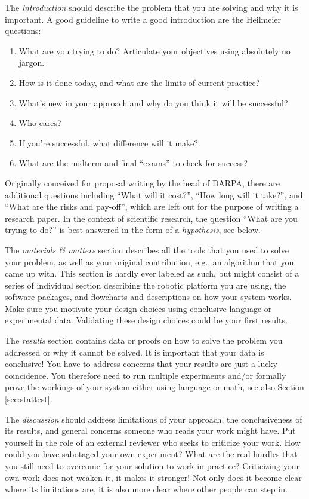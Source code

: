 \documentclass[paper=6.14in:9.21in,pagesize=pdftex,11pt,twoside,openright]{scrbook}
\begin{document}
The \emph{introduction} should describe the problem that you are solving and why it is important. A good guideline to write a good introduction are the Heilmeier questions:

\begin{enumerate}
\item What are you trying to do? Articulate your objectives using absolutely no jargon.
\item How is it done today, and what are the limits of current practice?
\item What's new in your approach and why do you think it will be successful?
\item Who cares?
\item If you're successful, what difference will it make?
\item What are the midterm and final ``exams'' to check for success?
\end{enumerate}

Originally conceived for proposal writing by the head of DARPA, there are additional questions including ``What will it cost?'', ``How long will it take?'', and ``What are the risks and pay-off'', which are left out for the purpose of writing a research paper. In the context of scientific research, the question ``What are you trying to do?'' is best answered in the form of a \emph{hypothesis}, see below.

The \emph{materials \& matters} section describes all the tools that you used to solve your problem, as well as your original contribution, e.g., an algorithm that you came up with. This section is hardly ever labeled as such, but might consist of a series of individual section describing the robotic platform you are using, the software packages, and flowcharts and descriptions on how your system works. Make sure you motivate your design choices using conclusive language or experimental data. Validating these design choices could be your first results.

The \emph{results} section contains data or proofs on how to solve the problem you addressed or why it cannot be solved. It is important that your data is conclusive! You have to address concerns that your results are just a lucky coincidence. You therefore need to run multiple experiments and/or formally prove the workings of your system either using language or math, see also Section \ref{sec:stattest}.

The \emph{discussion} should address limitations of your approach, the conclusiveness of its results, and general concerns someone who reads your work might have. Put yourself in the role of an external reviewer who seeks to criticize your work. How could you have sabotaged your own experiment? What are the real hurdles that you still need to overcome for your solution to work in practice? Criticizing your own  work does not weaken it, it makes it stronger! Not only does it become clear where its limitations are, it is also more clear where other people can step in.
\end{document}

